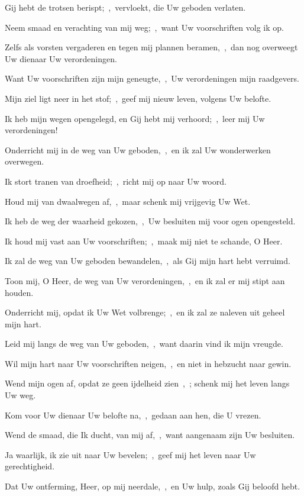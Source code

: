 \documentclass[12pt,twoside,a5paper]{article}
\begin{document}
\begin{halfparskip}
  Gij hebt de trotsen berispt;~\sep\ vervloekt, die Uw geboden verlaten.

  Neem smaad en verachting van mij weg;~\sep\ want Uw voorschriften volg ik op.

  Zelfs als vorsten vergaderen en tegen mij plannen beramen,~\sep\ dan nog overweegt Uw dienaar Uw verordeningen.

  Want Uw voorschriften zijn mijn geneugte,~\sep\ Uw verordeningen mijn raadgevers.

   Mijn ziel ligt neer in het stof;~\sep\ geef mij nieuw leven, volgens Uw belofte.

  Ik heb mijn wegen opengelegd, en Gij hebt mij verhoord;~\sep\ leer mij Uw verordeningen!

  Onderricht mij in de weg van Uw geboden,~\sep\ en ik zal Uw wonderwerken overwegen.

  Ik stort tranen van droefheid;~\sep\ richt mij op naar Uw woord.

  Houd mij van dwaalwegen af,~\sep\ maar schenk mij vrijgevig Uw Wet.

  Ik heb de weg der waarheid gekozen,~\sep\ Uw besluiten mij voor ogen opengesteld.

  Ik houd mij vast aan Uw voorschriften;~\sep\ maak mij niet te schande, O Heer.

  Ik zal de weg van Uw geboden bewandelen,~\sep\ als Gij mijn hart hebt verruimd.

   Toon mij, O Heer, de weg van Uw verordeningen,~\sep\ en ik zal er mij stipt aan houden.

  Onderricht mij, opdat ik Uw Wet volbrenge;~\sep\ en ik zal ze naleven uit geheel mijn hart.

  Leid mij langs de weg van Uw geboden,~\sep\ want daarin vind ik mijn vreugde.

  Wil mijn hart naar Uw voorschriften neigen,~\sep\ en niet in hebzucht naar gewin.

  Wend mijn ogen af, opdat ze geen ijdelheid zien~\sep\ ; schenk mij het leven langs Uw weg.

  Kom voor Uw dienaar Uw belofte na,~\sep\ gedaan aan hen, die U vrezen.

  Wend de smaad, die Ik ducht, van mij af,~\sep\ want aangenaam zijn Uw besluiten.

  Ja waarlijk, ik zie uit naar Uw bevelen;~\sep\ geef mij het leven naar Uw gerechtigheid.

   Dat Uw ontferming, Heer, op mij neerdale,~\sep\ en Uw hulp, zoals Gij beloofd hebt.


\end{halfparskip}
\end{document}
